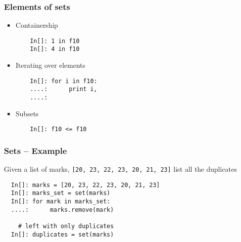 \begin{frame}[fragile]
  \frametitle{Elements of sets}
  \begin{itemize}
  \item Containership
    \begin{lstlisting}
    In[]: 1 in f10
    In[]: 4 in f10
    \end{lstlisting}
  \item Iterating over elements
    \begin{lstlisting}
    In[]: for i in f10:
    ....:      print i,
    ....:
    \end{lstlisting}
  \item Subsets
    \begin{lstlisting}
    In[]: f10 <= f10
    \end{lstlisting}
  \end{itemize}
\end{frame}

\begin{frame}[fragile]
  \frametitle{Sets -- Example}
  \begin{block}{}
    Given a list of marks, \texttt{[20, 23, 22, 23, 20, 21, 23]} list
    all the duplicates
  \end{block}
  \begin{lstlisting}
  In[]: marks = [20, 23, 22, 23, 20, 21, 23] 
  In[]: marks_set = set(marks)
  In[]: for mark in marks_set:
  ....:      marks.remove(mark)

    # left with only duplicates
  In[]: duplicates = set(marks)
  \end{lstlisting}
\end{frame}

